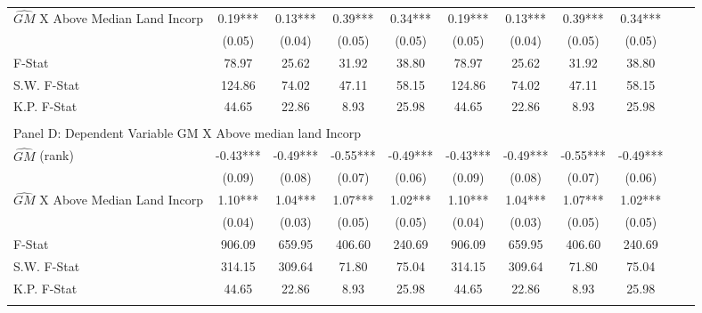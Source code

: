\begin{table}[htbp]
\begin{threeparttable}
\begin{tabular}{l*{10}{c}}
\addlinespace
$\hat{GM}$ X Above Median Land Incorp&       0.19***&       0.13***&       0.39***&       0.34***&       0.19***&       0.13***&       0.39***&       0.34***\\
                &     (0.05)   &     (0.04)   &     (0.05)   &     (0.05)   &     (0.05)   &     (0.04)   &     (0.05)   &     (0.05)   \\
\midrule
F-Stat          &      78.97   &      25.62   &      31.92   &      38.80   &      78.97   &      25.62   &      31.92   &      38.80   \\
S.W. F-Stat     &     124.86   &      74.02   &      47.11   &      58.15   &     124.86   &      74.02   &      47.11   &      58.15   \\
K.P. F-Stat     &      44.65   &      22.86   &       8.93   &      25.98   &      44.65   &      22.86   &       8.93   &      25.98   \\
\cmidrule[\heavyrulewidth](lr){1-9} \\ \cmidrule[\heavyrulewidth](lr){1-9}
\multicolumn{8}{l}{Panel D: Dependent Variable GM X Above median land Incorp}\\
\cmidrule(lr){1-9}
$\hat{GM}$ (rank)&      -0.43***&      -0.49***&      -0.55***&      -0.49***&      -0.43***&      -0.49***&      -0.55***&      -0.49***\\
                &     (0.09)   &     (0.08)   &     (0.07)   &     (0.06)   &     (0.09)   &     (0.08)   &     (0.07)   &     (0.06)   \\
\addlinespace
$\hat{GM}$ X Above Median Land Incorp&       1.10***&       1.04***&       1.07***&       1.02***&       1.10***&       1.04***&       1.07***&       1.02***\\
                &     (0.04)   &     (0.03)   &     (0.05)   &     (0.05)   &     (0.04)   &     (0.03)   &     (0.05)   &     (0.05)   \\
\midrule
F-Stat          &     906.09   &     659.95   &     406.60   &     240.69   &     906.09   &     659.95   &     406.60   &     240.69   \\
S.W. F-Stat     &     314.15   &     309.64   &      71.80   &      75.04   &     314.15   &     309.64   &      71.80   &      75.04   \\
K.P. F-Stat     &      44.65   &      22.86   &       8.93   &      25.98   &      44.65   &      22.86   &       8.93   &      25.98   \\
\cmidrule[\heavyrulewidth](lr){1-9} \\ \cmidrule[\heavyrulewidth](lr){1-9}

\end{tabular}
\end{threeparttable}
\end{table}
